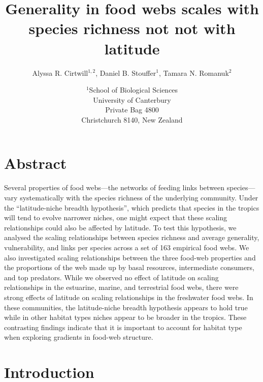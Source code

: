 \documentclass[12pt]{article}
\title{Generality in food webs scales with species richness not not with latitude}
\author{Alyssa R. Cirtwill$^{1,2}$, Daniel B. Stouffer$^{1}$, Tamara N. Romanuk$^{2}$}
\date{$^1$School of Biological Sciences\\University of Canterbury\\
Private Bag 4800\\Christchurch 8140, New Zealand}
\begin{document}
\maketitle
\baselineskip=8.5mm
 
\vspace{0.4 in}

\section*{Abstract}

Several properties of food webs---the networks of feeding links between
species---vary systematically with the species richness of the underlying
community.  Under the ``latitude-niche breadth hypothesis'', which predicts
that species in the tropics will tend to evolve narrower niches, one might
expect that these scaling relationships could also be affected by latitude. To
test this hypothesis, we analysed the scaling relationships between species
richness and average generality, vulnerability, and links per species across a
set of 163 empirical food webs.  We also investigated scaling relationships
between the three food-web properties and the proportions of the web made up 
by basal resources, intermediate consumers, and top predators. While we
observed no effect of latitude on scaling relationships in the estuarine,
marine, and terrestrial food webs, there were strong effects of latitude on
scaling relationships in the freshwater food webs. In these communities,
the latitude-niche breadth hypothesis appears to hold true while in other habitat
types niches appear to be broader in the tropics. These contrasting findings
indicate that it is important to account for habitat type when exploring gradients
in food-web structure.


\section*{Introduction} 
\end{document}
